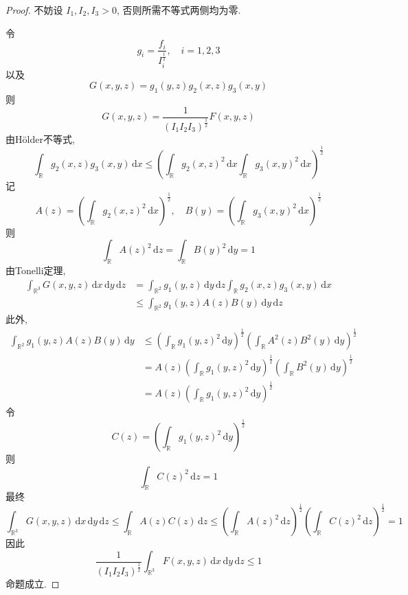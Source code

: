 \documentclass[../main.tex]{subfiles}
\begin{document}
\begin{proof}
不妨设 \(  I_1,I_2,I_3> 0  \), 否则所需不等式两侧均为零.

令 \[
g_{i}= \frac{f_{i} }{I_{i}^{\frac{1}{2}} },\quad i= 1,2,3 
\]
以及 \[
G\left( x,y,z \right)= g_1\left( y,z \right)g_2\left( x,z \right)g_3\left( x,y \right)    
\]则 \[
G\left( x,y,z \right)= \frac{1 }{\left( I_1I_2I_3 \right)^{\frac{1}{2}}  }F\left( x,y,z \right)   
\]
由H\"older不等式,
\[
\int_{\mathbb{R}}g_2\left( x,z \right)g_3\left( x,y \right)\,\mathrm{d} x\le  \left( \int_{\mathbb{R} }g_2\left( x,z \right)^{2}\,\mathrm{d} x  \int_{\mathbb{R} }g_3\left( x,y \right)  ^{2}\,\mathrm{d} x \right)^{\frac{1}{2}}
\]记 \[
A\left( z \right)=  \left( \int_{\mathbb{R} }g_2\left( x,z \right)^{2}  \,\mathrm{d} x\right)^{\frac{1}{2}},\quad B\left( y \right)= \left( \int_{\mathbb{R} }g_3\left( x,y \right)^{2}\,\mathrm{d} x  \right)^{\frac{1}{2}}    
\]则 \[
\int_{\mathbb{R} }A\left( z \right)^{2}\,\mathrm{d} z =  \int_{\mathbb{R} }B\left( y \right)^{2}\,\mathrm{d} y= 1  
\]由Tonelli定理,  \[
\begin{aligned}
\int_{\mathbb{R} ^{3}}G\left( x,y,z \right)\,\mathrm{d} x\,\mathrm{d} y\,\mathrm{d} z&= \int_{\mathbb{R} ^{2}}g_1\left( y,z \right)\,\mathrm{d} y\,\mathrm{d} z \int_{\mathbb{R}}g_2\left( x,z \right)g_3\left( x,y \right)\,\mathrm{d} x \\ 
 &\le \int_{\mathbb{R} ^{2}}g_1\left( y,z \right)A\left( z \right)B\left( y \right)  \,\mathrm{d}y\,\mathrm{d} z  
\end{aligned}    
\]此外,  \[
\begin{aligned}
\int_{\mathbb{R} ^{2}}g_1\left( y,z \right)A\left( z \right)B\left( y \right)\,\mathrm{d} y&\le \left( \int_{\mathbb{R} }g_1\left( y,z \right)^{2}\,\mathrm{d} y  \right)^{\frac{1}{2}} \left( \int_{\mathbb{R} }A^{2}\left( z \right)B^{2}\left( y \right)\,\mathrm{d} y    \right)^{\frac{1}{2}} \\ 
 &= A\left( z \right)  \left( \int_{\mathbb{R} }g_1\left( y,z \right)^{2}\,\mathrm{d} y  \right)^{\frac{1}{2}} \left( \int_{\mathbb{R} }B^{2}\left( y \right)\,\mathrm{d} y  \right)^{\frac{1}{2}}\\ 
  &= A\left( z \right)\left( \int_{\mathbb{R} }g_1\left( y,z \right)^{2}\,\mathrm{d} y  \right)^{\frac{1}{2}}   
\end{aligned}
\]令 \[
C\left( z \right)=  \left( \int_{\mathbb{R} }g_1\left( y,z \right)^{2}\,\mathrm{d} y   \right)^{\frac{1}{2}} 
\]
    则 \[
    \int_{\mathbb{R} }C\left( z \right)^{2}\,\mathrm{d} z=  1
    \]最终 \[
    \int_{\mathbb{R} ^{3}}G\left( x,y,z \right)\,\mathrm{d} x\,\mathrm{d} y\,\mathrm{d} z\le  \int_{\mathbb{R} }A\left( z \right)C\left( z \right)\,\mathrm{d} z\le  \left( \int_{\mathbb{R} }A\left( z \right)^{2}\,\mathrm{d} z  \right)^{\frac{1}{2}}\left( \int_{\mathbb{R} }C\left( z \right)^{2}\,\mathrm{d} z  \right)^{\frac{1}{2}}= 1     
    \]因此 \[
    \frac{1 }{\left( I_1I_2I_3 \right)^{\frac{1}{2}}  }\int_{\mathbb{R}^{3} }F\left( x,y,z \right)\,\mathrm{d} x\,\mathrm{d} y\,\mathrm{d} z\le 1  
    \]命题成立.
\end{proof}
\end{document}
